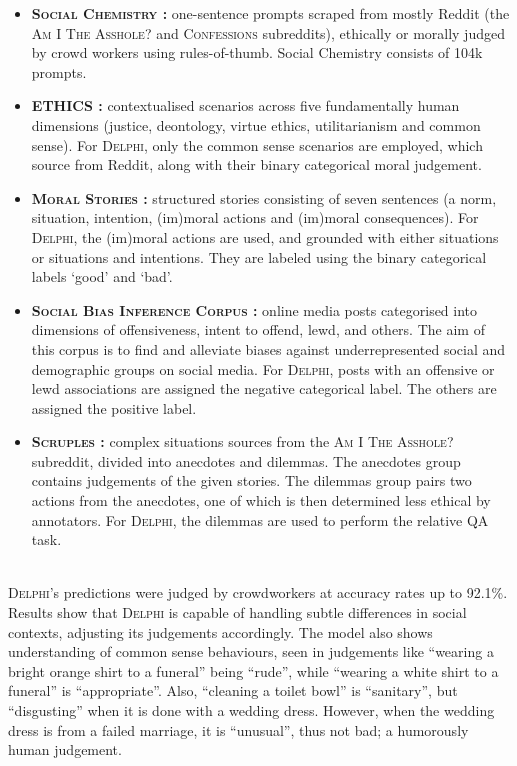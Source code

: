 \documentclass[final]{clv3} %
\begin{document}
\begin{itemize}
  \item \textbf{\textsc{Social Chemistry} \cite{forbes}:} one-sentence prompts scraped from mostly Reddit (the \textsc{Am I The Asshole?} and \textsc{Confessions} subreddits), ethically or morally judged by crowd workers using rules-of-thumb. Social Chemistry consists of 104k prompts. 
  \item \textbf{\textsc{ETHICS} \cite{hendrycks} :} contextualised scenarios across five fundamentally human dimensions (justice, deontology, virtue ethics, utilitarianism and common sense). For \textsc{Delphi}, only the common sense scenarios are employed, which source from Reddit, along with their binary categorical moral judgement. 
  \item \textbf{\textsc{Moral Stories} \cite{emelin}:} structured stories consisting of seven sentences (a norm, situation, intention, (im)moral actions and (im)moral consequences). For \textsc{Delphi}, the (im)moral actions are used, and grounded with either situations or situations and intentions. They are labeled using the binary categorical labels ‘good’ and ‘bad’. 
  \item \textbf{\textsc{Social Bias Inference Corpus} \cite{sap}:} online media posts categorised into dimensions of offensiveness, intent to offend, lewd, and others. The aim of this corpus is to find and alleviate biases against underrepresented social and demographic groups on social media. For \textsc{Delphi}, posts with an offensive or lewd associations are assigned the negative categorical label. The others are assigned the positive label. 
  \item \textbf{\textsc{Scruples} \cite{lourie-scruples}:}  complex situations sources from the \textsc{Am I The Asshole?} subreddit, divided into anecdotes and dilemmas. The anecdotes group contains judgements of the given stories. The dilemmas group pairs two actions from the anecdotes, one of which is then determined less ethical by annotators. For \textsc{Delphi}, the dilemmas are used to perform the relative QA task. 
\end{itemize}\\

\textsc{Delphi}’s predictions were judged by crowdworkers at accuracy rates up to 92.1\%. Results show that \textsc{Delphi} is capable of handling subtle differences in social contexts, adjusting its judgements accordingly. The model also shows understanding of common sense behaviours, seen in judgements like “wearing a bright orange shirt to a funeral” being “rude”, while “wearing a white shirt to a funeral” is “appropriate”. Also, “cleaning a toilet bowl” is “sanitary”, but “disgusting” when it is done with a wedding dress. However, when the wedding dress is from a failed marriage, it is “unusual”, thus not bad; a humorously human judgement. \\
\end{document}
